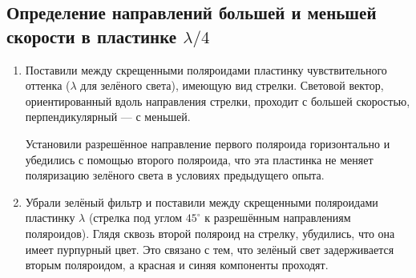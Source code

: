 \documentclass[a4paper,12pt]{article}
\begin{document}
	\subsection*{Определение направлений большей и меньшей скорости в пластинке $\lambda/4$}
	\begin{enumerate}
		\item Поставили между скрещенными поляроидами пластинку чувствительного оттенка ($\lambda$ для зелёного света), имеющую вид стрелки. Световой вектор, ориентированный вдоль направления стрелки, проходит с большей скоростью, перпендикулярный --- с меньшей.
		
		Установили разрешённое направление первого поляроида горизонтально 	и убедились с помощью второго поляроида, что эта пластинка не меняет поляризацию зелёного света в условиях предыдущего опыта.
		
		\item Убрали зелёный фильтр и поставили между скрещенными поляроидами пластинку $\lambda$ (стрелка под углом $45^\circ$ к разрешённым направлениям поляроидов). Глядя сквозь второй поляроид на стрелку, убудились, что она имеет пурпурный цвет. Это связано с тем, что зелёный свет задерживается вторым поляроидом, а красная и синяя компоненты проходят.
		

\end{enumerate}
\end{document}
